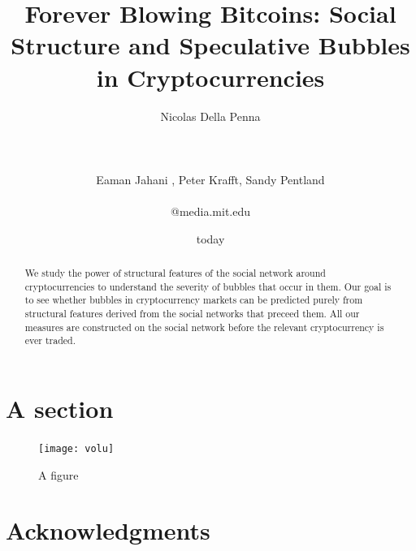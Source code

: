 \documentclass{acm_proc_article-_p}%
\title{Forever Blowing Bitcoins: Social Structure and Speculative Bubbles in Cryptocurrencies}
\author{
\alignauthor
Nicolas Della Penna \\%
       \affaddr{Australian National University}\\
       \affaddr{1932 Wallamaloo Lane}\\
       \affaddr{Wallamaloo, New Zealand}\\
       \email{trovato@corporation.com}
\alignauthor
Eaman Jahani , Peter Krafft, Sandy Pentland\\

       \affaddr{Massachusetts Institute of Technology}\\
      \email{\{eaman,pkrafft,sandy\}}@media.mit.edu}
\date{today}
\begin{document}
\maketitle

\begin{abstract}

We study the power of structural features of the social network around cryptocurrencies to understand the severity of bubbles that occur in them. Our goal is to see whether bubbles in cryptocurrency markets can be predicted purely from structural features derived from the social networks that preceed them. All our measures are constructed on the social network before the relevant cryptocurrency is ever traded. 

\end{abstract}

\section{A section}

\begin{figure}
  \texttt{[image: volu]}
  \caption{A figure}
\end{figure}












%






\section{Acknowledgments}

%

%
%
\appendix

\newpage

\newpage


\end{document}
